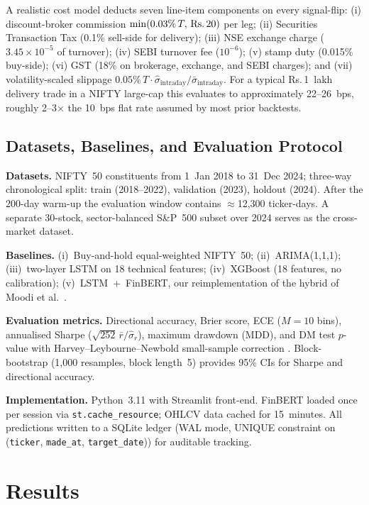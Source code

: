 \documentclass[12pt,a4paper]{article}
\begin{document}
A realistic cost model deducts seven line-item components on every signal-flip:
(i) discount-broker commission $\min(0.03\%\,T,\,\text{Rs.\,}20)$ per leg;
(ii) Securities Transaction Tax (0.1\% sell-side for delivery);
(iii) NSE exchange charge ($3.45\times10^{-5}$ of turnover);
(iv) SEBI turnover fee ($10^{-6}$);
(v) stamp duty (0.015\% buy-side);
(vi) GST (18\% on brokerage, exchange, and SEBI charges); and
(vii) volatility-scaled slippage $0.05\%\,T\cdot\hat\sigma_{\mathrm{intraday}}/\bar\sigma_{\mathrm{intraday}}$.
For a typical Rs.\,1~lakh delivery trade in a NIFTY large-cap this evaluates to
approximately 22--26~bps, roughly 2--3$\times$ the 10~bps flat rate assumed by
most prior backtests.

\subsection{Datasets, Baselines, and Evaluation Protocol}

\textbf{Datasets.} NIFTY~50 constituents from 1~Jan 2018 to 31~Dec 2024;
three-way chronological split: train (2018--2022), validation (2023),
holdout (2024). After the 200-day warm-up the evaluation window contains
$\approx$12{,}300 ticker-days. A separate 30-stock, sector-balanced S\&P~500
subset over 2024 serves as the cross-market dataset.

\textbf{Baselines.} (i)~Buy-and-hold equal-weighted NIFTY~50; (ii)~ARIMA(1,1,1);
(iii)~two-layer LSTM on 18 technical features; (iv)~XGBoost (18 features, no
calibration); (v)~LSTM~+~FinBERT, our reimplementation of the hybrid of
Moodi et al.\ \cite{r5}.

\textbf{Evaluation metrics.} Directional accuracy, Brier score, ECE
($M=10$ bins), annualised Sharpe ($\sqrt{252}\,\bar{r}/\hat\sigma_r$),
maximum drawdown (MDD), and DM test $p$-value \cite{r21} with
Harvey--Leybourne--Newbold small-sample correction \cite{r29}.
Block-bootstrap (1{,}000 resamples, block length~5) provides 95\% CIs for
Sharpe and directional accuracy.

\textbf{Implementation.} Python~3.11 with Streamlit front-end. FinBERT loaded
once per session via \texttt{st.cache\_resource}; OHLCV data cached for
15~minutes. All predictions written to a SQLite ledger (WAL mode, UNIQUE
constraint on (\texttt{ticker}, \texttt{made\_at}, \texttt{target\_date}))
for auditable tracking.

\section{Results}
\end{document}

